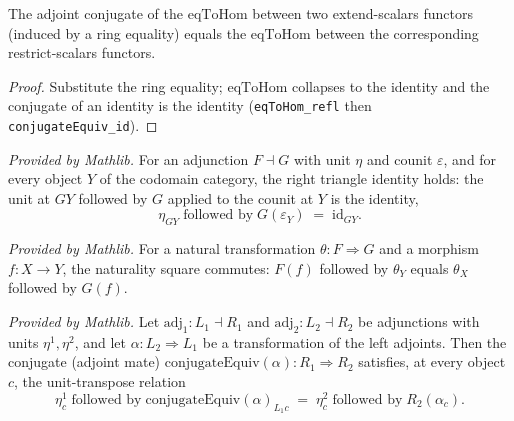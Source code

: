 \begin{lemma}
  \label{lem:conjugateEquiv_extendScalars_eqToHom}
  The adjoint conjugate of the \(\mathrm{eqToHom}\) between two extend-scalars functors (induced by a
  ring equality) equals the \(\mathrm{eqToHom}\) between the corresponding restrict-scalars functors.
  \begin{proof}
    Substitute the ring equality; \(\mathrm{eqToHom}\) collapses to the identity and the conjugate of an
    identity is the identity (\texttt{eqToHom\_refl} then \texttt{conjugateEquiv\_id}).
  \end{proof}
\end{lemma}

\begin{lemma}
  \label{lem:right_triangle_components_mathlib}
  \mathlibok
  \textit{Provided by Mathlib.}
  For an adjunction \(F \dashv G\) with unit \(\eta\) and counit \(\varepsilon\), and
  for every object \(Y\) of the codomain category, the right triangle identity holds:
  the unit at \(G Y\) followed by \(G\) applied to the counit at \(Y\) is the identity,
  \[
    \eta_{G Y} \;\text{followed by}\; G(\varepsilon_Y) \;=\; \mathrm{id}_{G Y}.
  \]
\end{lemma}

\begin{lemma}
  \label{lem:natTrans_naturality_mathlib}
  \mathlibok
  \textit{Provided by Mathlib.}
  For a natural transformation \(\theta : F \Rightarrow G\) and a morphism
  \(f : X \to Y\), the naturality square commutes: \(F(f)\) followed by \(\theta_Y\)
  equals \(\theta_X\) followed by \(G(f)\).
\end{lemma}

\begin{lemma}
  \label{lem:unit_conjugateEquiv_mathlib}
  \mathlibok
  \textit{Provided by Mathlib.}
  Let \(\mathrm{adj}_1 : L_1 \dashv R_1\) and \(\mathrm{adj}_2 : L_2 \dashv R_2\) be
  adjunctions with units \(\eta^1, \eta^2\), and let \(\alpha : L_2 \Rightarrow L_1\)
  be a transformation of the left adjoints. Then the conjugate (adjoint mate)
  \(\mathrm{conjugateEquiv}(\alpha) : R_1 \Rightarrow R_2\) satisfies, at every object
  \(c\), the unit-transpose relation
  \[
    \eta^1_c \;\text{followed by}\; \mathrm{conjugateEquiv}(\alpha)_{L_1 c}
    \;=\; \eta^2_c \;\text{followed by}\; R_2(\alpha_c).
  \]
\end{lemma}

